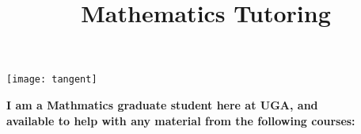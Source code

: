 

\usepackage{stubs}
\usepackage{fontawesome}

\title{
	\textbf{Mathematics Tutoring}\\
}
\author{}
\date{}


\maketitle
\vspace{-5em}
\texttt{[image: tangent]}
\vspace{2em}
\\
\begin{center}
  \textbf{I am a Mathmatics graduate student here at UGA, and \\ available to help with any material from the following courses:}
\end{center}

